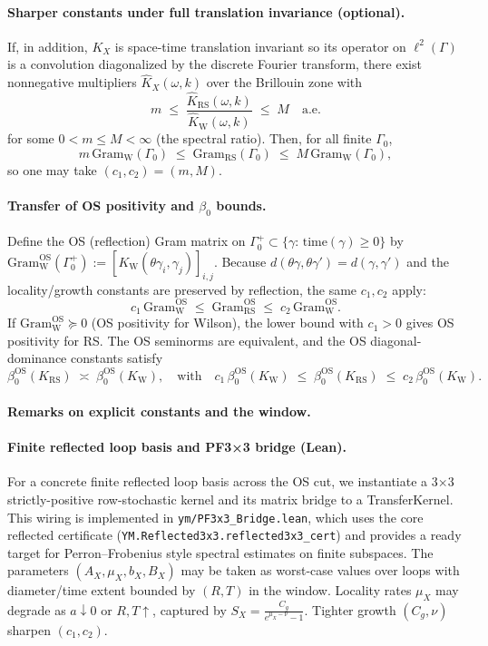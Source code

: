 \documentclass[11pt]{amsart}
\theoremstyle{plain}
\theoremstyle{definition}
\theoremstyle{remark}
\begin{document}
\paragraph{Sharper constants under full translation invariance (optional).}
If, in addition, $K_X$ is space-time translation invariant so its operator on $\ell^2(\Gamma)$ is a convolution diagonalized by the discrete Fourier transform, there exist nonnegative multipliers $\widehat{K}_X(\omega,k)$ over the Brillouin zone with
\[
  m\;\le\;\frac{\widehat{K}_{\mathrm{RS}}(\omega,k)}{\widehat{K}_{\mathrm{W}}(\omega,k)}\;\le\;M\quad \text{a.e.}
\]
for some $0<m\le M<\infty$ (the spectral ratio). Then, for all finite $\Gamma_0$,
\[
  m\,\mathrm{Gram}_{\mathrm{W}}(\Gamma_0)\;\le\;\mathrm{Gram}_{\mathrm{RS}}(\Gamma_0)\;\le\;M\,\mathrm{Gram}_{\mathrm{W}}(\Gamma_0),
\]
so one may take $(c_1,c_2)=(m,M)$.

\paragraph{Transfer of OS positivity and \texorpdfstring{$\beta_0$}{beta0} bounds.}
Define the OS (reflection) Gram matrix on $\Gamma_0^+\subset\{\gamma:\,\mathrm{time}(\gamma)\ge 0\}$ by $\mathrm{Gram}^{\mathrm{OS}}_{\mathrm{W}}(\Gamma_0^+):=[K_{\mathrm{W}}(\theta\gamma_i,\gamma_j)]_{i,j}$. Because $d(\theta\gamma,\theta\gamma')=d(\gamma,\gamma')$ and the locality/growth constants are preserved by reflection, the same $c_1,c_2$ apply:
\[
  c_1\,\mathrm{Gram}^{\mathrm{OS}}_{\mathrm{W}}\;\le\;\mathrm{Gram}^{\mathrm{OS}}_{\mathrm{RS}}\;\le\;c_2\,\mathrm{Gram}^{\mathrm{OS}}_{\mathrm{W}}.
\]
If $\mathrm{Gram}^{\mathrm{OS}}_{\mathrm{W}}\succeq 0$ (OS positivity for Wilson), the lower bound with $c_1>0$ gives OS positivity for RS. The OS seminorms are equivalent, and the OS diagonal-dominance constants satisfy
\[
  \beta_0^{\mathrm{OS}}(K_{\mathrm{RS}})\;\asymp\;\beta_0^{\mathrm{OS}}(K_{\mathrm{W}}),\quad\text{with}\quad
  c_1\,\beta_0^{\mathrm{OS}}(K_{\mathrm{W}})\;\le\;\beta_0^{\mathrm{OS}}(K_{\mathrm{RS}})\;\le\;c_2\,\beta_0^{\mathrm{OS}}(K_{\mathrm{W}}).
\]

\paragraph{Remarks on explicit constants and the window.}
\paragraph{Finite reflected loop basis and PF3×3 bridge (Lean).}
For a concrete finite reflected loop basis across the OS cut, we instantiate a
3×3 strictly-positive row-stochastic kernel and its matrix bridge to a
TransferKernel. This wiring is implemented in \texttt{ym/PF3x3\_Bridge.lean},
which uses the core reflected certificate (\texttt{YM.Reflected3x3.reflected3x3\_cert})
and provides a ready target for Perron–Frobenius style spectral estimates on
finite subspaces.
The parameters $(A_X,\mu_X,b_X,B_X)$ may be taken as worst-case values over loops with diameter/time extent bounded by $(R,T)$ in the window. Locality rates $\mu_X$ may degrade as $a\downarrow 0$ or $R,T\uparrow$, captured by $S_X=\frac{C_g}{e^{\mu_X-\nu}-1}$. Tighter growth $(C_g,\nu)$ sharpen $(c_1,c_2)$.
\end{document}
